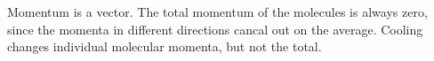 Momentum is a vector. The total momentum of the
molecules is always zero, since the momenta in different
directions cancal out on the average. Cooling changes
individual molecular momenta, but not the total.



